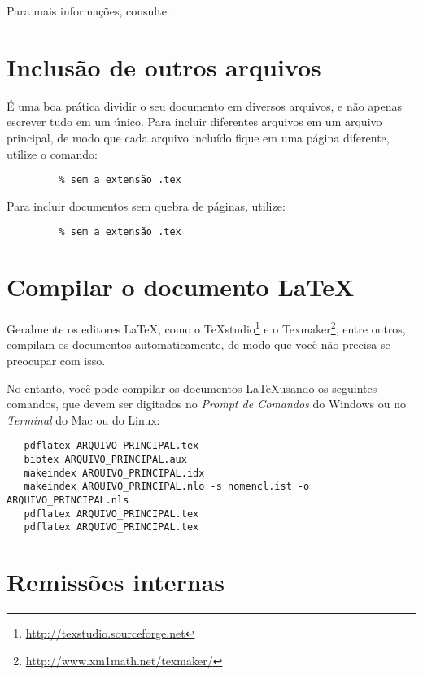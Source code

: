 \documentclass[12pt,oneside,a4paper,chapter=TITLE,
			   english,brazil]{abntex2}
\begin{document}
\begin{anexosenv}
Para mais informações, consulte .

\section{Inclusão de outros arquivos}\label{sec-include}

É uma boa prática dividir o seu documento em diversos arquivos, e não apenas escrever tudo em um único. Para incluir diferentes arquivos em um arquivo principal, de modo que cada arquivo incluído fique em uma página diferente, utilize o comando:
\begin{verbatim}
         % sem a extensão .tex
\end{verbatim}

Para incluir documentos sem quebra de páginas, utilize:
\begin{verbatim}
         % sem a extensão .tex
\end{verbatim}

\section{Compilar o documento \LaTeX}

Geralmente os editores \LaTeX, como o TeXstudio\footnote{\url{http://texstudio.sourceforge.net}} e o Texmaker\footnote{\url{http://www.xm1math.net/texmaker/}}, entre outros, compilam os documentos automaticamente, de modo que você não precisa se preocupar com isso.

No entanto, você pode compilar os documentos \LaTeX usando os seguintes comandos, que devem ser digitados no \emph{Prompt de Comandos} do Windows ou no \emph{Terminal} do Mac ou do Linux:
\begin{verbatim}
   pdflatex ARQUIVO_PRINCIPAL.tex
   bibtex ARQUIVO_PRINCIPAL.aux
   makeindex ARQUIVO_PRINCIPAL.idx 
   makeindex ARQUIVO_PRINCIPAL.nlo -s nomencl.ist -o ARQUIVO_PRINCIPAL.nls
   pdflatex ARQUIVO_PRINCIPAL.tex
   pdflatex ARQUIVO_PRINCIPAL.tex
\end{verbatim}

\section{Remissões internas}


\end{anexosenv}
\end{document}
